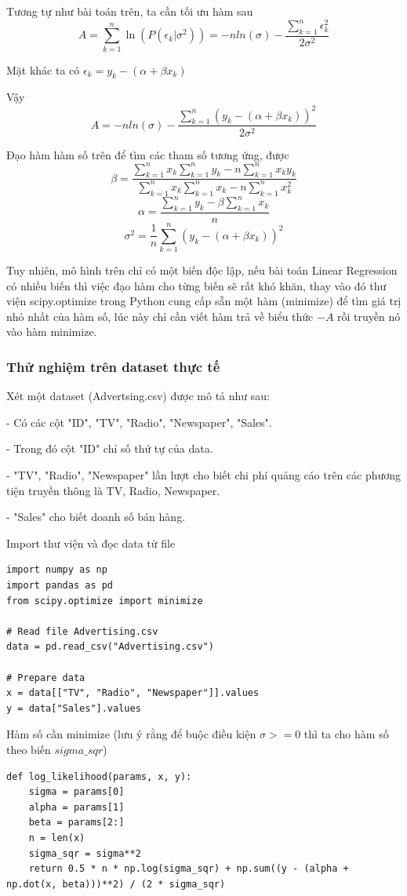 \documentclass[12pt]{article}
\begin{document}
{{\noindent Tương tự như bài toán trên, ta cần tối ưu hàm sau
$$A=\sum_{k = 1}^{n}\ln(P(\epsilon_k|\sigma^2)) = -nln{(\sigma)} - \frac{\sum_{k = 1}^{n}\epsilon_k^2}{2\sigma^2}$$

\noindent Mặt khác ta có $\epsilon_k = y_k - (\alpha + \beta x_k)$

\noindent Vậy $$A = -nln{(\sigma)} - \frac{\sum_{k = 1}^{n}(y_k - (\alpha + \beta x_k))^2}{2\sigma^2}$$

\noindent Đạo hàm hàm số trên để tìm các tham số tương ứng, được
$$\beta =\frac{\sum_{k = 1}^{n}x_k \sum_{k = 1}^{n}y_k-n\sum_{k = 1}^{n}x_k y_k}{\sum_{k = 1}^{n}x_k \sum_{k = 1}^{n}x_k-n\sum_{k = 1}^{n}x_k^2}$$
$$\alpha = \frac{\sum_{k = 1}^{n}y_k - \beta \sum_{k = 1}^{n}x_k}{n}$$
$$\sigma^2 = \frac{1}{n}\sum_{k = 1}^{n}(y_k-(\alpha + \beta x_k))^2$$

\noindent Tuy nhiên, mô hình trên chỉ có một biến độc lập, nếu bài toán Linear Regression có nhiều biến thì việc đạo hàm cho từng biến sẽ rất khó khăn, thay vào đó thư viện scipy.optimize trong Python cung cấp sẵn một hàm (minimize) để tìm giá trị nhỏ nhất của hàm số, lúc này chỉ cần viết hàm trả về biểu thức $-A$ rồi truyền nó vào hàm minimize.

\subsubsection{Thử nghiệm trên dataset thực tế}
\noindent Xét một dataset (Advertsing.csv) được mô tả như sau: 

- Có các cột "ID", "TV", "Radio", "Newspaper", "Sales". 

- Trong đó cột "ID" chỉ số thứ tự của data.

- "TV", "Radio", "Newspaper" lần lượt cho biết chi phí quảng cáo trên các phương tiện truyền thông là TV, Radio, Newspaper.

- "Sales" cho biết doanh số bán hàng.

\noindent Import thư viện và đọc data từ file
\begin{lstlisting}
import numpy as np
import pandas as pd
from scipy.optimize import minimize

# Read file Advertising.csv
data = pd.read_csv("Advertising.csv")

# Prepare data
x = data[["TV", "Radio", "Newspaper"]].values
y = data["Sales"].values
\end{lstlisting}

\noindent Hàm số cần minimize (lưu ý rằng để buộc điều kiện $\sigma >=0$ thì ta cho hàm số theo biến $sigma\_sqr$)
\begin{lstlisting}
def log_likelihood(params, x, y):
    sigma = params[0]
    alpha = params[1]
    beta = params[2:]
    n = len(x)
    sigma_sqr = sigma**2
    return 0.5 * n * np.log(sigma_sqr) + np.sum((y - (alpha + np.dot(x, beta)))**2) / (2 * sigma_sqr)
\end{lstlisting}

}}
\end{document}

